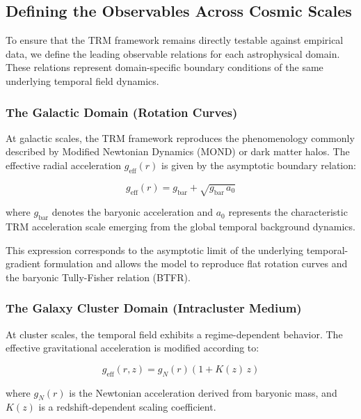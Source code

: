 \documentclass[11pt]{article}
\begin{document}
\subsection{Defining the Observables Across Cosmic Scales}

To ensure that the TRM framework remains directly testable against empirical data, we define the leading observable relations for each astrophysical domain. These relations represent domain-specific boundary conditions of the same underlying temporal field dynamics.

\subsubsection{The Galactic Domain (Rotation Curves)}

At galactic scales, the TRM framework reproduces the phenomenology commonly described by Modified Newtonian Dynamics (MOND) or dark matter halos. The effective radial acceleration $g_{\mathrm{eff}}(r)$ is given by the asymptotic boundary relation:

\begin{equation}
	g_{\mathrm{eff}}(r) = g_{\mathrm{bar}} + \sqrt{g_{\mathrm{bar}}\, a_0}
\end{equation}

where $g_{\mathrm{bar}}$ denotes the baryonic acceleration and $a_0$ represents the characteristic TRM acceleration scale emerging from the global temporal background dynamics.

This expression corresponds to the asymptotic limit of the underlying temporal-gradient formulation and allows the model to reproduce flat rotation curves and the baryonic Tully-Fisher relation (BTFR).

\subsubsection{The Galaxy Cluster Domain (Intracluster Medium)}

At cluster scales, the temporal field exhibits a regime-dependent behavior. The effective gravitational acceleration is modified according to:

\begin{equation}
	g_{\mathrm{eff}}(r,z) = g_N(r)\left(1 + K(z)\,z\right)
\end{equation}

where $g_N(r)$ is the Newtonian acceleration derived from baryonic mass, and $K(z)$ is a redshift-dependent scaling coefficient.
\end{document}
